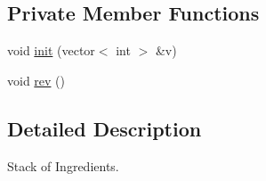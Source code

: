 \subsection*{Private Member Functions}
\begin{DoxyCompactItemize}
\item 
void \hyperlink{classDish_a339f74a03ef948efcc726eaccdf4bd51}{init} (vector$<$ int $>$ \&v)
\item 
void \hyperlink{classDish_ade464eeeeddcd5d8bc37e96a80654b1e}{rev} ()
\end{DoxyCompactItemize}


\subsection{Detailed Description}
Stack of Ingredients. 

